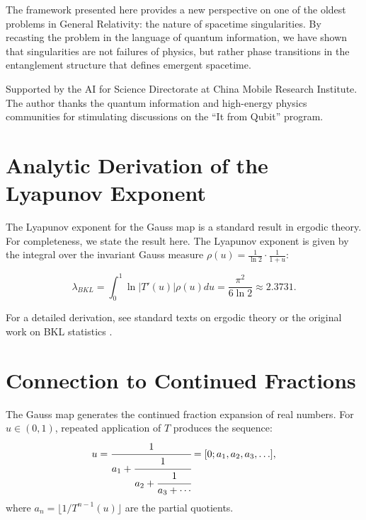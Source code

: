 \documentclass[aps,prd,reprint,nofootinbib,amsmath,amssymb,amsfonts]{revtex4-2}
\begin{document}
The framework presented here provides a new perspective on one of the oldest problems in General Relativity: the nature of spacetime singularities. By recasting the problem in the language of quantum information, we have shown that singularities are not failures of physics, but rather phase transitions in the entanglement structure that defines emergent spacetime.

\begin{acknowledgments}
Supported by the AI for Science Directorate at China Mobile Research Institute. The author thanks the quantum information and high-energy physics communities for stimulating discussions on the ``It from Qubit'' program.
\end{acknowledgments}

\appendix

\section{Analytic Derivation of the Lyapunov Exponent}
\label{app:lyapunov}

The Lyapunov exponent for the Gauss map is a standard result in ergodic theory. For completeness, we state the result here. The Lyapunov exponent is given by the integral over the invariant Gauss measure $\rho(u) = \frac{1}{\ln 2} \cdot \frac{1}{1+u}$:

\begin{equation}
    \lambda_{BKL} = \int_0^1 \ln |T'(u)| \rho(u) du = \frac{\pi^2}{6 \ln 2} \approx 2.3731.
\end{equation}

For a detailed derivation, see standard texts on ergodic theory or the original work on BKL statistics \cite{bkl1970, Chernoff1983}.

\section{Connection to Continued Fractions}
\label{app:continued_fractions}

The Gauss map generates the continued fraction expansion of real numbers. For $u \in (0,1)$, repeated application of $T$ produces the sequence:
\begin{equation}
    u = \cfrac{1}{a_1 + \cfrac{1}{a_2 + \cfrac{1}{a_3 + \cdots}}} = [0; a_1, a_2, a_3, \ldots],
\end{equation}
where $a_n = \lfloor 1/T^{n-1}(u) \rfloor$ are the partial quotients.
\end{document}
